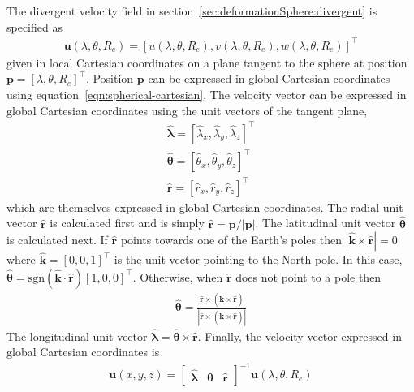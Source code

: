The divergent velocity field in section~\ref{sec:deformationSphere:divergent} is specified as
\begin{align}
	\mathbf{u}(\lambda, \theta, R_e) = \left[ 
	u(\lambda, \theta, R_e),
	v(\lambda, \theta, R_e),
	w(\lambda, \theta, R_e)
	\right]^\intercal
\end{align}
given in local Cartesian coordinates on a plane tangent to the sphere at position $\mathbf{p} = \left[ \lambda, \theta, R_e \right]^\intercal$.  Position $\mathbf{p}$ can be expressed in global Cartesian coordinates using equation~\ref{eqn:spherical-cartesian}.
The velocity vector can be expressed in global Cartesian coordinates using the unit vectors of the tangent plane,
\begin{align}
	\bm{\hat{\lambda}} = \left[ \hat{\lambda}_x, \hat{\lambda}_y, \hat{\lambda}_z \right]^\intercal \\
	\bm{\hat{\theta}} = \left[ \hat{\theta}_x, \hat{\theta}_y, \hat{\theta}_z \right]^\intercal \\
	\mathbf{\hat{r}} = \left[ \hat{r}_x, \hat{r}_y, \hat{r}_z \right]^\intercal
\end{align}
which are themselves expressed in global Cartesian coordinates.
The radial unit vector $\mathbf{\hat{r}}$ is calculated first and is simply $\mathbf{\hat{r}} = \mathbf{p} / \left\lvert \mathbf{p} \right\rvert$.
The latitudinal unit vector $\bm{\hat{\theta}}$ is calculated next.  If $\mathbf{\hat{r}}$ points towards one of the Earth's poles then $\left\lvert \mathbf{\hat{k}} \times \mathbf{\hat{r}}\right\rvert = 0$ where $\mathbf{\hat{k}} = \left[0, 0, 1\right]^\intercal$ is the unit vector pointing to the North pole.
In this case, $\bm{\hat{\theta}} = \mathrm{sgn}(\mathbf{\hat{k}} \cdot \mathbf{\hat{r}}) \left[1, 0, 0\right]^\intercal$.  Otherwise, when $\mathbf{\hat{r}}$ does not point to a pole then
\begin{align}
	\bm{\hat{\theta}} = \frac{\mathbf{\hat{r}} \times \left( \mathbf{\hat{k}} \times \mathbf{\hat{r}} \right)}{\left\lvert\mathbf{\hat{r}} \times \left( \mathbf{\hat{k}} \times \mathbf{\hat{r}} \right)\right\rvert}
\end{align}
The longitudinal unit vector $\bm{\hat{\lambda}} = \bm{\hat{\theta}} \times \mathbf{\hat{r}}$.
Finally, the velocity vector expressed in global Cartesian coordinates is
\begin{align}
	\mathbf{u}(x, y, z) = 
	\begin{bmatrix}
		\bm{\hat{\lambda}} &
		\bm{\hat{\theta}} &
		\mathbf{\hat{r}}
	\end{bmatrix}^{-1}
	\mathbf{u}(\lambda, \theta, R_e)
\end{align}

